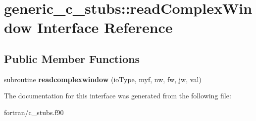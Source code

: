 \hypertarget{interfacegeneric__c__stubs_1_1read_complex_window}{}\section{generic\+\_\+c\+\_\+stubs\+:\+:read\+Complex\+Window Interface Reference}
\label{interfacegeneric__c__stubs_1_1read_complex_window}
\subsection*{Public Member Functions}
\begin{DoxyCompactItemize}
\item 
\mbox{\label{interfacegeneric__c__stubs_1_1read_complex_window_aa1e5f3eb4c233b8ff7a5a0ce1007faaf}} 
subroutine {\bfseries readcomplexwindow} (io\+Type, myf, nw, fw, jw, val)
\end{DoxyCompactItemize}


The documentation for this interface was generated from the following file\+:\begin{DoxyCompactItemize}
\item 
fortran/c\+\_\+stubs.\+f90\end{DoxyCompactItemize}
